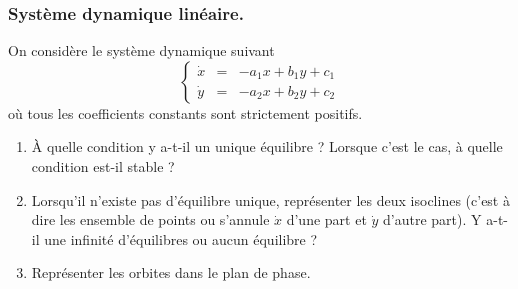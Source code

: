 \subsubsection{Système dynamique linéaire.} 

On considère le système dynamique suivant
$$
\left\{\begin{array}{rcl}
        \dot x & = & -a_1 x + b_1 y + c_1 \\ 
        \dot y & = & -a_2 x + b_2 y + c_2
        \end{array}\right.
$$
où tous les coefficients constants sont strictement positifs.
\begin{enumerate}
  \item À quelle condition y a-t-il un unique équilibre ? Lorsque c’est le cas, à quelle condition est-il stable ?
  \solution{\todo{}}
  \item Lorsqu’il n’existe pas d’équilibre unique, représenter les deux isoclines (c'est à dire les ensemble de points ou s'annule $\dot x$ d'une part et $\dot y$ d'autre part). Y a-t-il une infinité d’équilibres ou aucun équilibre ?
  \solution{\todo{}}
  \item Représenter les orbites dans le plan de phase.
  \solution{\todo{}}
\end{enumerate}
